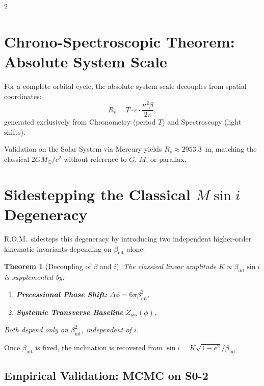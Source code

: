 \documentclass[10pt, a4paper]{article}
\newtheorem{theorem}{Theorem}[section]
\begin{document}
\begin{multicols}{2}
\section{Chrono-Spectroscopic Theorem: Absolute System Scale}
\hypertarget{sec:absolute_scale}{}\label{sec:absolute_scale}

For a complete orbital cycle, the absolute system scale decouples from spatial coordinates:
\[
R_{s} = T \cdot c \cdot \frac{\kappa^{2}\beta}{2\pi},
\]
generated exclusively from Chronometry (period $T$) and Spectroscopy (light shifts).

Validation on the Solar System via Mercury yields $R_s \approx 2953.3$~m, matching the classical $2GM_\odot/c^2$ without reference to $G$, $M$, or parallax.



\section{Sidestepping the Classical $M\sin i$ Degeneracy}
\hypertarget{sec:M_sin(i)}{}\label{sec:M_sin(i)}

R.O.M.\ sidesteps this degeneracy by introducing two independent higher-order kinematic invariants depending on $\beta_{\text{int}}$ alone:

\begin{theorem}[Decoupling of $\beta$ and $i$]
The classical linear amplitude $K \propto \beta_{\text{int}} \sin i$ is supplemented by:
\begin{enumerate}[nosep]
    \item \textbf{Precessional Phase Shift:} $\Delta\phi = 6\pi\beta_{\text{int}}^2$,
    \item \textbf{Systemic Transverse Baseline} $Z_{\text{sys}}(\phi)$.
\end{enumerate}
Both depend only on $\beta_{\text{int}}^2$, independent of $i$.
\end{theorem}

Once $\beta_{\text{int}}$ is fixed, the inclination is recovered from $\sin i = K\sqrt{1-e^2}/\beta_{\text{int}}$.

\subsection{Empirical Validation: MCMC on S0-2}
\hypertarget{sec:mcmc_s02}{}\label{sec:mcmc_s02}


\end{multicols}
\end{document}
